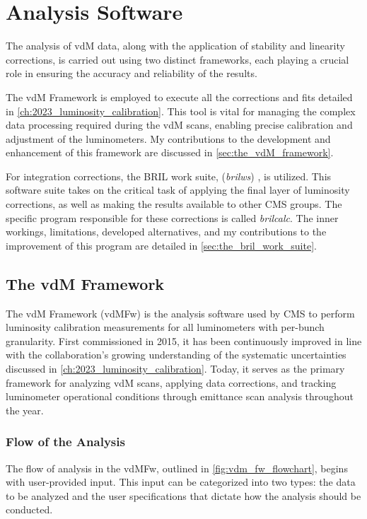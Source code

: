 \chapter{Analysis Software}

The analysis of vdM data, along with the application of stability and linearity corrections, is carried out using two distinct frameworks, each playing a crucial role in ensuring the accuracy and reliability of the results.

The vdM Framework \cite{VdMFramework} is employed to execute all the corrections and fits detailed in \autoref{ch:2023_luminosity_calibration}. This tool is vital for managing the complex data processing required during the vdM scans, enabling precise calibration and adjustment of the luminometers. My contributions to the development and enhancement of this framework are discussed in \autoref{sec:the_vdM_framework}.

For integration corrections, the BRIL work suite, (\textit{brilws}) \cite{xie_bril}, is utilized. This software suite takes on the critical task of applying the final layer of luminosity corrections, as well as making the results available to other CMS groups. The specific program responsible for these corrections is called \textit{brilcalc}. The inner workings, limitations, developed alternatives, and my contributions to the improvement of this program are detailed in \autoref{sec:the_bril_work_suite}.

\section{The vdM Framework}
\label{sec:the_vdM_framework}

The vdM Framework (vdMFw) is the analysis software used by CMS to perform luminosity calibration measurements for all luminometers with per-bunch granularity. First commissioned in 2015, it has been continuously improved in line with the collaboration’s growing understanding of the systematic uncertainties discussed in \autoref{ch:2023_luminosity_calibration}. Today, it serves as the primary framework for analyzing vdM scans, applying data corrections, and tracking luminometer operational conditions through emittance scan analysis throughout the year.

\subsection{Flow of the Analysis}

The flow of analysis in the vdMFw, outlined in \autoref{fig:vdm_fw_flowchart}, begins with user-provided input. This input can be categorized into two types: the data to be analyzed and the user specifications that dictate how the analysis should be conducted.

